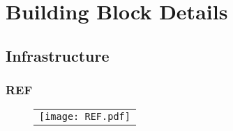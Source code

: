 \documentclass[a4paper,12pt]{article}
\begin{document}














\section{Building Block Details}
\subsection{Infrastructure}
\subsubsection{REF}
   \begin{figure}
   \begin{center}
   \begin{tabular}{c}
   \texttt{[image: REF.pdf]}
   \end{tabular}
   \end{center}
   \end{figure}
\end{document}
